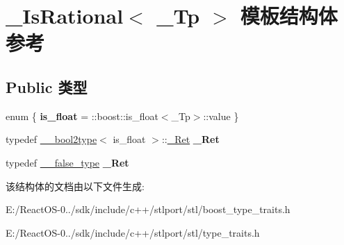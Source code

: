 \hypertarget{struct___is_rational}{}\section{\+\_\+\+Is\+Rational$<$ \+\_\+\+Tp $>$ 模板结构体 参考}
\label{struct___is_rational}
\subsection*{Public 类型}
\begin{DoxyCompactItemize}
\item 
\mbox{\label{struct___is_rational_a34f6e263dc45051e0733b4f89e0ae4a6}} 
enum \{ {\bfseries is\+\_\+float} = \+:\+:boost\+:\+:is\+\_\+float$<$\+\_\+\+Tp$>$\+:\+:value
 \}
\item 
\mbox{\label{struct___is_rational_a85ead91aebd6da75e709975148d7e8d7}} 
typedef \hyperlink{struct____bool2type}{\+\_\+\+\_\+bool2type}$<$ is\+\_\+float $>$\+::\hyperlink{struct____true__type}{\+\_\+\+Ret} {\bfseries \+\_\+\+Ret}
\item 
\mbox{\label{struct___is_rational_addfd62d2fba28fdef1a7aac75e284862}} 
typedef \hyperlink{struct____false__type}{\+\_\+\+\_\+false\+\_\+type} {\bfseries \+\_\+\+Ret}
\end{DoxyCompactItemize}


该结构体的文档由以下文件生成\+:\begin{DoxyCompactItemize}
\item 
E\+:/\+React\+O\+S-\/0../sdk/include/c++/stlport/stl/boost\+\_\+type\+\_\+traits.\+h\item 
E\+:/\+React\+O\+S-\/0../sdk/include/c++/stlport/stl/type\+\_\+traits.\+h\end{DoxyCompactItemize}
